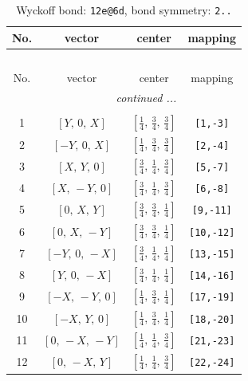 \documentclass[fleqn,8pt]{jsarticle}
\begin{document}
\renewcommand{\arraystretch}{1.2}
\begin{longtable}{cccc}
\caption{Wyckoff bond: {\tt 12e@6d}, bond symmetry: {\tt 2..}}
 \\
 \hline \hline
No. & vector & center & mapping \\ \hline \endfirsthead

\multicolumn{3}{l}{\tablename\ \thetable{}} \\
 \hline \hline
No. & vector & center & mapping \\ \hline \endhead

 \hline \hline
\multicolumn{3}{r}{\footnotesize\it continued ...} \\ \endfoot

 \hline \hline
\multicolumn{3}{r}{} \\ \endlastfoot

1 & $\left[ Y,\, 0,\, X \right]$ & $\left[ \frac{1}{4},\, \frac{3}{4},\, \frac{3}{4} \right]$ & {\tt [1,-3]} \\ \hline
2 & $\left[ - Y,\, 0,\, X \right]$ & $\left[ \frac{1}{4},\, \frac{3}{4},\, \frac{3}{4} \right]$ & {\tt [2,-4]} \\ \hline
3 & $\left[ X,\, Y,\, 0 \right]$ & $\left[ \frac{3}{4},\, \frac{1}{4},\, \frac{3}{4} \right]$ & {\tt [5,-7]} \\ \hline
4 & $\left[ X,\, - Y,\, 0 \right]$ & $\left[ \frac{3}{4},\, \frac{1}{4},\, \frac{3}{4} \right]$ & {\tt [6,-8]} \\ \hline
5 & $\left[ 0,\, X,\, Y \right]$ & $\left[ \frac{3}{4},\, \frac{3}{4},\, \frac{1}{4} \right]$ & {\tt [9,-11]} \\ \hline
6 & $\left[ 0,\, X,\, - Y \right]$ & $\left[ \frac{3}{4},\, \frac{3}{4},\, \frac{1}{4} \right]$ & {\tt [10,-12]} \\ \hline
7 & $\left[ - Y,\, 0,\, - X \right]$ & $\left[ \frac{3}{4},\, \frac{1}{4},\, \frac{1}{4} \right]$ & {\tt [13,-15]} \\ \hline
8 & $\left[ Y,\, 0,\, - X \right]$ & $\left[ \frac{3}{4},\, \frac{1}{4},\, \frac{1}{4} \right]$ & {\tt [14,-16]} \\ \hline
9 & $\left[ - X,\, - Y,\, 0 \right]$ & $\left[ \frac{1}{4},\, \frac{3}{4},\, \frac{1}{4} \right]$ & {\tt [17,-19]} \\ \hline
10 & $\left[ - X,\, Y,\, 0 \right]$ & $\left[ \frac{1}{4},\, \frac{3}{4},\, \frac{1}{4} \right]$ & {\tt [18,-20]} \\ \hline
11 & $\left[ 0,\, - X,\, - Y \right]$ & $\left[ \frac{1}{4},\, \frac{1}{4},\, \frac{3}{4} \right]$ & {\tt [21,-23]} \\ \hline
12 & $\left[ 0,\, - X,\, Y \right]$ & $\left[ \frac{1}{4},\, \frac{1}{4},\, \frac{3}{4} \right]$ & {\tt [22,-24]} \\
\end{longtable}
\end{document}
